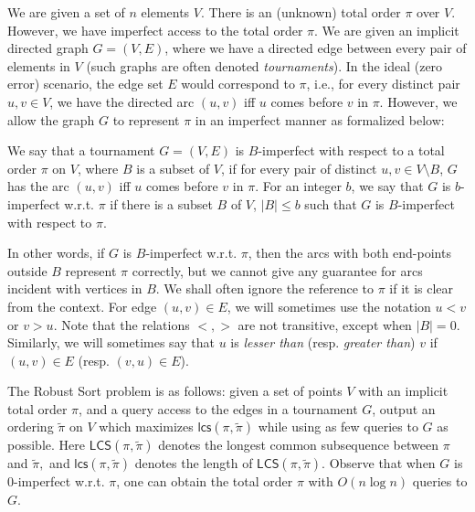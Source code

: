 \documentclass[11pt]{llncs}
\newcommand{\tpi}{{\widetilde \pi}}
\newcommand{\robust}{{\textsf{Robust Sort}}\xspace}
\newcommand{\LCS}{{\textsf{LCS}}}
\newcommand{\lcs}{{\textsf{lcs}}}
\begin{document}
We are given a set of $n$ elements $V$. There is an (unknown) total order $\pi$ over $V$. However, we have imperfect access to the total order $\pi$. We are given an implicit directed graph $G = (V, E)$, where we have a directed edge between every pair of elements in $V$ (such graphs are often denoted {\em tournaments}). In the ideal (zero error) scenario, the edge set $E$ would correspond to $\pi$, i.e., for every distinct pair $u, v \in V$, we have the directed arc $(u,v)$ iff $u$ comes before $v$ in $\pi$. However, we allow the graph $G$ to represent $\pi$ in an imperfect manner as formalized below: 

\begin{definition}
We say that a tournament $G=(V, E)$ is $B$-imperfect with respect to a total order $\pi$ on $V$, where $B$ is a subset of $V$, if for every pair of distinct $u,v \in V \setminus B$, $G$ has the arc $(u,v)$  iff $u$ comes before $v$ in $\pi$. For an integer $b$, we say that $G$ is $b$-imperfect w.r.t. $\pi$ if there is a subset $B$ of $V$, $|B| \leq b$ such that $G$ is $B$-imperfect with respect to $\pi$. 
\end{definition}
In other words, if $G$ is $B$-imperfect w.r.t. $\pi$, then the arcs with both end-points outside $B$ represent $\pi$ correctly, but we cannot give any guarantee for arcs incident with vertices in $B$. We shall often ignore the reference to $\pi$ if it is clear from the context. For edge $(u, v) \in E$, we will sometimes use the notation $u < v$ or $v > u$. Note that the relations $<, >$ are not transitive, except when $|B| = 0$. Similarly, we will sometimes say that $u$ is {\it lesser than} (resp. {\it greater than}) $v$ if $(u, v) \in E$ (resp. $(v, u) \in E$).

The \robust problem is as follows: given a set of points $V$ with an implicit total order $\pi$, and a query access to the edges in a tournament  $G$, output an ordering $\tpi$ on $V$ which maximizes $\lcs(\pi, \tpi)$ while using as few queries to $G$ as possible.  Here $\LCS(\pi, \tpi)$ denotes the  longest common subsequence between $\pi$ and $\tpi,$ and $\lcs(\pi, \tpi)$ denotes the length of $\LCS(\pi, \tpi)$. Observe that when $G$ is $0$-imperfect w.r.t. $\pi$, one can obtain the total order $\pi$ with $O(n \log n)$ queries to $G$.
\end{document}
